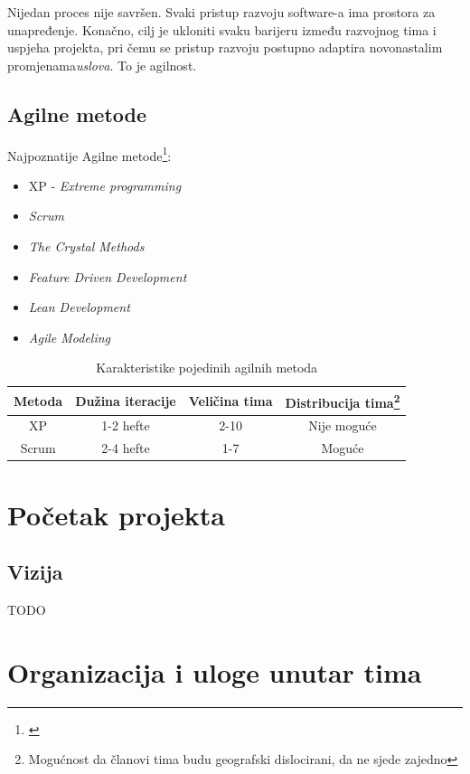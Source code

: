 \documentclass[lmodern, utf8, zavrsni]{fit}
\begin{document}
Nijedan proces nije savršen. Svaki pristup razvoju software-a ima prostora za unapređenje. Konačno, cilj je ukloniti svaku barijeru između razvojnog tima i uspjeha projekta, pri čemu se pristup razvoju postupno adaptira novonastalim promjenama\emph{uslova}. To je agilnost.\citep[str 355]{agileart}

\section{Agilne metode}

Najpoznatije Agilne metode\footnote{\citep{agiledacs}}:
\begin{itemize}
  \item XP - \emph{Extreme programming}
  \item \emph{Scrum}
  \item \emph{The Crystal Methods}
  \item \emph{Feature Driven Development}
  \item \emph{Lean Development}
  \item \emph{Agile Modeling}
\end{itemize}

\begin{savenotes}
\begin{table}[ht]
\centering
\begin{tabular}{c c c c}
\hline\hline
Metoda & Dužina iteracije & Veličina tima & Distribucija tima\footnote{{Mogućnost da članovi tima budu geografski dislocirani, da ne sjede zajedno}} \\
\hline
   XP  & 1-2 hefte & 2-10 & Nije moguće \\
  Scrum & 2-4 hefte & 1-7 & Moguće \\ [1ex]
\hline
\end{tabular}
\label{table:methodkarakteristike}
\caption{Karakteristike pojedinih agilnih metoda}
\end{table}
\end{savenotes}

\chapter{Početak projekta}

\section{Vizija}


TODO

\chapter{Organizacija i uloge unutar tima}
\end{document}
